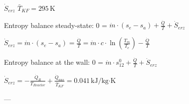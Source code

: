 \( \dot{S}_{erz} \)  
\( \bar{T}_{KF} = 295 \, \text{K} \)  

Entropy balance steady-state:  
0 = \( \dot{m} \cdot (s_{e} - s_{a}) + \frac{\dot{Q}}{T} + \dot{S}_{erz} \)  

\( \dot{S}_{erz} = \dot{m} \cdot (s_{e} - s_{a}) = \frac{\dot{Q}}{T} = \dot{m} \cdot c \cdot \ln \left( \frac{T_{m}}{T_{e}} \right) - \frac{\dot{Q}}{T} \)  

Entropy balance at the wall:  
0 = \( \dot{m} \cdot s^0_{12} + \frac{\dot{Q}}{T} + \dot{S}_{erz} \)  

\( \dot{S}_{erz} = -\frac{\dot{Q}_R}{T_{Reactor}} + \frac{\dot{Q}_{aus}}{\bar{T}_{KF}} = 0.041 \, \text{kJ/kg·K} \)  

---